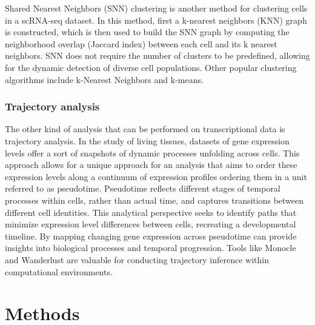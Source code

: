 \documentclass[11pt]{article}
\begin{document}
\begin{multicols}{2}
    Shared Nearest Neighbors (SNN) clustering is another method for clustering cells in a scRNA-seq dataset\cite{kumari_et_al_scalable_2016}. In this method, first a k-nearest neighbors (KNN) graph is constructed, which is then used to build the SNN graph by computing the neighborhood overlap (Jaccard index) between each cell and its k nearest neighbors. SNN does not require the number of clusters to be predefined, allowing for the dynamic detection of diverse cell populations. Other popular clustering algorithms include k-Nearest Neighbors and k-means.

    \subsubsection{Trajectory analysis}

    The other kind of analysis that can be performed on transcriptional data is trajectory analysis. In the study of living tissues, datasets of gene expression levels offer a sort of snapshots of dynamic processes unfolding across cells. This approach allows for a unique approach for an analysis that aims to order these expression levels along a continuum of expression profiles ordering them in a unit referred to as pseudotime\cite{trapnell_dynamics_2014}. Pseudotime reflects different stages of temporal processes within cells, rather than actual time, and captures transitions between different cell identities. This analytical perspective seeks to identify paths that minimize expression level differences between cells, recreating a developmental timeline. By mapping changing gene expression across pseudotime can provide insights into biological processes and temporal progression. Tools like Monocle\cite{trapnell_dynamics_2014} and Wanderlust\cite{bendall_single-cell_2014} are valuable for conducting trajectory inference within computational environments.
    
\end{multicols}


\section{Methods}
\end{document}
